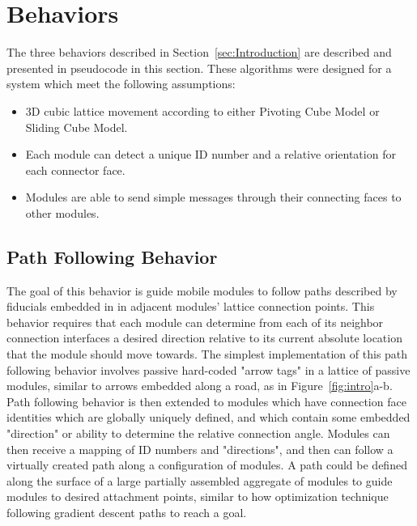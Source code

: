 \section{Behaviors}
\label{sec:Behaviors}

The three behaviors described in Section~\ref{sec:Introduction} are described and presented in pseudocode in this section. These algorithms were designed for a system which meet the following assumptions:
\begin{itemize}
	\item 3D cubic lattice movement according to either Pivoting Cube Model or Sliding Cube Model.
	\item Each module can detect a unique ID number and a relative orientation for each connector face.
	\item Modules are able to send simple messages through their connecting faces to other modules.
\end{itemize}

\subsection{Path Following Behavior}
\label{sec:algArrow}

The goal of this behavior is guide mobile modules to follow paths described by fiducials embedded in in adjacent modules' lattice connection points. This behavior requires that  each module can determine from each of its neighbor connection interfaces a desired direction relative to its current absolute location that the module should move towards. The simplest implementation of this path following behavior involves passive hard-coded "arrow tags" in a lattice of passive modules, similar to arrows embedded along a road, as in Figure~\ref{fig:intro}a-b. Path following behavior is then extended to modules which have connection face identities which are globally uniquely defined, and which contain some embedded "direction" or ability to determine the relative connection angle. Modules can then receive a mapping of ID numbers and "directions", and then can follow a virtually created path along a configuration of modules. A path could be defined along the surface of a large partially assembled aggregate of modules to guide modules to desired attachment points, similar to how optimization technique following gradient descent paths to reach a goal.

